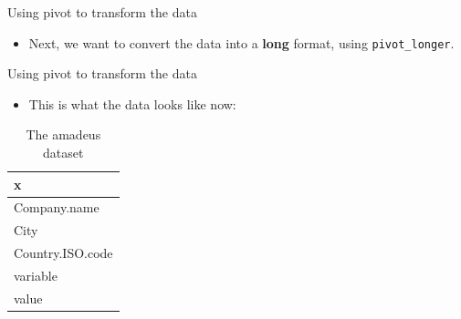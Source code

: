 \documentclass[10pt,ignorenonframetext,]{beamer}
\newenvironment{Shaded}{\begin{snugshade}}{\end{snugshade}}
\newcommand{\DataTypeTok}[1]{\textcolor[rgb]{0.13,0.29,0.53}{#1}}
\newcommand{\DecValTok}[1]{\textcolor[rgb]{0.00,0.00,0.81}{#1}}
\newcommand{\KeywordTok}[1]{\textcolor[rgb]{0.13,0.29,0.53}{\textbf{#1}}}
\newcommand{\NormalTok}[1]{#1}
\newcommand{\OperatorTok}[1]{\textcolor[rgb]{0.81,0.36,0.00}{\textbf{#1}}}
\newcommand{\StringTok}[1]{\textcolor[rgb]{0.31,0.60,0.02}{#1}}
\providecommand{\tightlist}{%
  \setlength{\itemsep}{0pt}\setlength{\parskip}{0pt}}
\begin{document}
\begin{frame}[fragile]{Using pivot to transform the data}
\protect\hypertarget{using-pivot-to-transform-the-data}{}

\begin{itemize}
\tightlist
\item
  Next, we want to convert the data into a \textbf{long} format, using
  \texttt{pivot\_longer}.
\end{itemize}

\begin{Shaded}
\end{Shaded}

\end{frame}

\begin{frame}{Using pivot to transform the data}
\protect\hypertarget{using-pivot-to-transform-the-data-1}{}

\begin{itemize}
\tightlist
\item
  This is what the data looks like now:
\end{itemize}

\begin{table}

\caption{\label{tab:unnamed-chunk-22}The amadeus dataset}
\centering
\begin{tabular}[t]{l}
\toprule
x\\
\midrule
\rowcolor{gray!6}  Company.name\\
City\\
\rowcolor{gray!6}  Country.ISO.code\\
variable\\
\rowcolor{gray!6}  value\\
\bottomrule
\end{tabular}
\end{table}

\end{frame}
\end{document}
